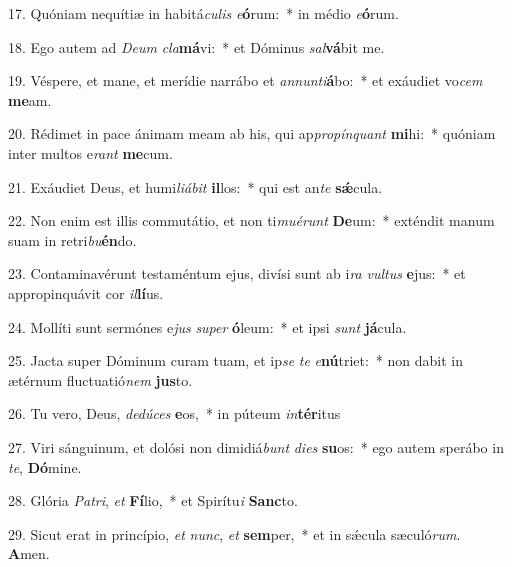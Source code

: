 17. Quóniam nequítiæ in habitá\textit{cu}\textit{lis} \textit{e}\textbf{ó}rum:~*  in médio \textit{e}\textbf{ó}rum.\

18. Ego autem ad \textit{De}\textit{um} \textit{cla}\textbf{má}vi:~*  et Dóminus \textit{sal}\textbf{vá}bit me.\

19. Véspere, et mane, et merídie narrábo et \textit{an}\textit{nun}\textit{ti}\textbf{á}bo:~*  et exáudiet vo\textit{cem} \textbf{me}am.\

20. Rédimet in pace ánimam meam ab his, qui ap\textit{pro}\textit{pín}\textit{quant} \textbf{mi}hi:~*  quóniam inter multos e\textit{rant} \textbf{me}cum.\

21. Exáudiet Deus, et humi\textit{li}\textit{á}\textit{bit} \textbf{il}los:~*  qui est an\textit{te} \textbf{sǽ}cula.\

22. Non enim est illis commutátio, et non ti\textit{mu}\textit{é}\textit{runt} \textbf{De}um:~*  exténdit manum suam in retri\textit{bu}\textbf{én}do.\

23. Contaminavérunt testaméntum ejus, divísi sunt ab i\textit{ra} \textit{vul}\textit{tus} \textbf{e}jus:~*  et appropinquávit cor \textit{il}\textbf{lí}us.\

24. Mollíti sunt sermónes e\textit{jus} \textit{su}\textit{per} \textbf{ó}leum:~*  et ipsi \textit{sunt} \textbf{já}cula.\

25. Jacta super Dóminum curam tuam, et ip\textit{se} \textit{te} \textit{e}\textbf{nú}triet:~*  non dabit in ætérnum fluctuatió\textit{nem} \textbf{jus}to.\

26. Tu vero, Deus, \textit{de}\textit{dú}\textit{ces} \textbf{e}os,~*  in púteum \textit{in}\textbf{tér}itus\

27. Viri sánguinum, et dolósi non dimidiá\textit{bunt} \textit{di}\textit{es} \textbf{su}os:~*  ego autem sperábo in \textit{te}, \textbf{Dó}mine.\

28. Glória \textit{Pa}\textit{tri}, \textit{et} \textbf{Fí}lio,~*  et Spirítu\textit{i} \textbf{Sanc}to.\

29. Sicut erat in princípio, \textit{et} \textit{nunc}, \textit{et} \textbf{sem}per,~*  et in sǽcula sæculó\textit{rum}. \textbf{A}men.\

